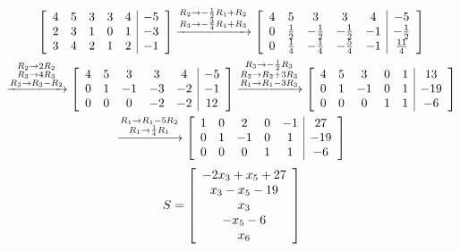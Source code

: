 \documentclass[11pt]{homework}
\begin{document}
    \begin{multline}
        \left[\begin{array}{ccccc|c}
            4 & 5 & 3 & 3 & 4 & -5 \\ 
            2 & 3 & 1 & 0 & 1 & -3 \\ 
            3 & 4 & 2 & 1 & 2 & -1
            \end{array}\right]
        \xrightarrow{\substack{R_{2}\to-\frac{1}{2}R_{1}+R_{2}\\R_{3}\to-\frac{3}{4}R_{1}+R_{3}}}
        \left[\begin{array}{ccccc|c}
        4 & 5 & 3 & 3 & 4 & -5 \\ 
        0 & \frac{1}{2} & -\frac{1}{2} & -\frac{1}{2} & -1 & -\frac{1}{2} \\ 
        0 & \frac{1}{4} & -\frac{1}{4} & -\frac{5}{4} & -1 & \frac{11}{4}
        \end{array}\right]\\
        \xrightarrow{\substack{R_{2}\to2R_{2}\\R_{3}\to4R_{3}\\R_{3}\to R_{3}-R_{2}}}
        \left[\begin{array}{ccccc|c}
        4 & 5 & 3 & 3 & 4 & -5 \\ 
        0 & 1 & -1 & -3 & -2 & -1 \\ 
        0 & 0 & 0 & -2 & -2 & 12
        \end{array}\right]
        \xrightarrow{\substack{R_{3}\to-\frac{1}{2}R_{3}\\
        R_{2}\to R_{2}+3R_{3}\\
        R_{1}\to R_{1}-3R_{3}}}
        \left[\begin{array}{ccccc|c}
        4 & 5 & 3 & 0 & 1 & 13 \\ 
        0 & 1 & -1 & 0 & 1 & -19 \\ 
        0 & 0 & 0 & 1 & 1 & -6
        \end{array}\right]\\
        \xrightarrow{\substack{R_{1}\to R_{1}-5R_{2}\\
        R_{1}\to\frac{1}{4}R_{1}}}
        \left[\begin{array}{ccccc|c}
        1 & 0 & 2 & 0 & -1 & 27 \\ 
        0 & 1 & -1 & 0 & 1 & -19 \\ 
        0 & 0 & 0 & 1 & 1 & -6
        \end{array}\right]
    \end{multline}
    \begin{equation}
        S=
        \left[\begin{array}{c}
        -2x_{3}+x_{5}+27 \\ 
        x_{3}-x_{5}-19 \\ 
        x_{3} \\ 
        -x_{5}-6 \\ 
        x_{6}
        \end{array}\right]
    \end{equation}
\end{document}

